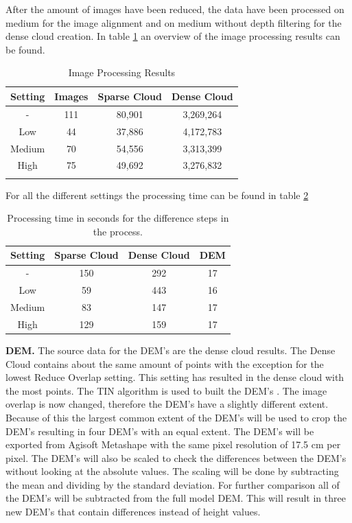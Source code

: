 \documentclass{isprs} %
\begin{document}
After the amount of images have been reduced, the data have been processed on medium for the image alignment and on medium without depth filtering for the dense cloud creation.
In table \ref{tab:ImageProcessing} an overview of the image processing results can be found.

\begin{table}[h]
    \centering
    \caption{Image Processing Results}
    \begin{tabular}{@{}cccc@{}}
    \toprule
    \textbf{Setting} & \textbf{Images} & \multicolumn{1}{l}{\textbf{Sparse Cloud}} & \multicolumn{1}{l}{\textbf{Dense Cloud}} \\ \midrule
    -      & 111 & 80,901 & 3,269,264 \\
    Low    & 44  & 37,886 & 4,172,783 \\
    Medium & 70  & 54,556 & 3,313,399 \\
    High   & 75  & 49,692 & 3,276,832 \\ \bottomrule
    \label{tab:ImageProcessing}
\end{tabular}
\end{table}

For all the different settings the processing time can be found in table \ref{tab:processingTime}

\begin{table}[h]
    \centering
    \caption{Processing time in seconds for the difference steps in the process.}
    \label{tab:processingTime}
    \begin{tabular}{@{}cccc@{}}
    \toprule
    \textbf{Setting} & \textbf{Sparse Cloud} & \multicolumn{1}{l}{\textbf{Dense Cloud}} & \multicolumn{1}{l}{\textbf{DEM}} \\ 
    \midrule
    -      & 150 & 292 & 17 \\
    Low    & 59  & 443 & 16 \\
    Medium & 83  & 147 & 17 \\
    High   & 129 & 159 & 17 \\ \bottomrule
\end{tabular}
\end{table}

\textbf{DEM.}
The source data for the DEM's are the dense cloud results. 
The Dense Cloud contains about the same amount of points with the exception for the lowest Reduce Overlap setting.
This setting has resulted in the dense cloud with the most points.
The TIN algorithm is used to built the DEM's \citep{axelsson1999processing}.
The image overlap is now changed, therefore the DEM's have a slightly different extent.
Because of this the largest common extent of the DEM's will be used to crop the DEM's resulting in four DEM's with an equal extent.
The DEM's will be exported from Agisoft Metashape with the same pixel resolution of 17.5 cm per pixel.
The DEM's will also be scaled to check the differences between the DEM's without looking at the absolute values.
The scaling will be done by subtracting the mean and dividing by the standard deviation.
For further comparison all of the DEM's will be subtracted from the full model DEM.
This will result in three new DEM's that contain differences instead of height values.
\end{document}
